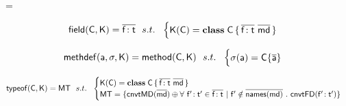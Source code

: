 \documentclass[a4paper,UKenglish,final]{lipics}
\begin{document}
\hrulefill


\mtype\m\C\K = \convert{\methz\m\C\K} 

\hrulefill


\begin{equation*}
\field\C\K = \b{\Ftype\f\t} ~~s.t.~~ \begin{cases}

 \K(\C) = \Class \C {\b{\Ftype\f\t}}{\b\md}
\end{cases}
\end{equation*}

\hrulefill


\begin{equation*}
\methdef\a\s\K = \method\C\K ~~s.t.~~ \begin{cases}

 \s(\a) = \obj\C{\b\a}\\
\end{cases}
\end{equation*}



% 
% 
% 

\hrulefill


\begin{equation*}
\classoff\C\K = \Mxt{MT} ~~s.t.~~ \begin{cases}

 \K(\C) = \Class \C {\b{\Ftype\f\t}}{\b\md} \\
 \Mxt{MT} = \{\convert{\b\md} \oplus \forall ~\Ftype\fp\tp \in \b{\Ftype\f\t} ~|~ \fp \notin \b{\names{\md}} ~.~ \convertFD{\Ftype\fp\tp}\}

\end{cases}
\end{equation*}

\hrulefill
\end{document}
